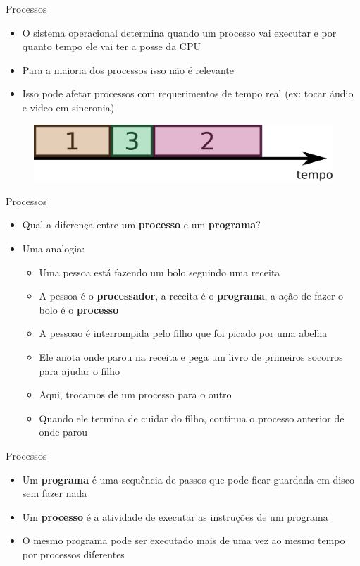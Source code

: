 \documentclass{beamer}
\begin{document}
\begin{frame}{Processos}
	\begin{itemize}
		\item O sistema operacional determina quando um processo vai executar e por quanto tempo ele vai ter a posse da CPU
		\item Para a maioria dos processos isso não é relevante
		\item Isso pode afetar processos com requerimentos de tempo real (ex: tocar áudio e video em sincronia)
	\end{itemize}
	\begin{figure}
		\includegraphics[width=0.5\paperwidth]{resources/time}
	\end{figure}
\end{frame}
\begin{frame}{Processos}
	\begin{itemize}
		\item Qual a diferença entre um \textbf{processo} e um \textbf{programa}? \pause
		\item Uma analogia:
		\begin{itemize}
			\item Uma pessoa está fazendo um bolo seguindo uma receita
			\item A pessoa é o \textbf{processador}, a receita é o \textbf{programa}, a ação de fazer o bolo é o \textbf{processo}
			\item A pessoao é interrompida pelo filho que foi picado por uma abelha
			\item Ele anota onde parou na receita e pega um livro de primeiros socorros para ajudar o filho
			\item Aqui, trocamos de um processo para o outro
			\item Quando ele termina de cuidar do filho, continua o processo anterior de onde parou
		\end{itemize}
	\end{itemize}
\end{frame}
\begin{frame}{Processos}
	\begin{itemize}
		\item Um \textbf{programa} é uma sequência de passos que pode ficar guardada em disco sem fazer nada
		\item Um \textbf{processo} é a atividade de executar as instruções de um programa
		\item O mesmo programa pode ser executado mais de uma vez ao mesmo tempo por processos diferentes
	\end{itemize}
\end{frame}
\end{document}
